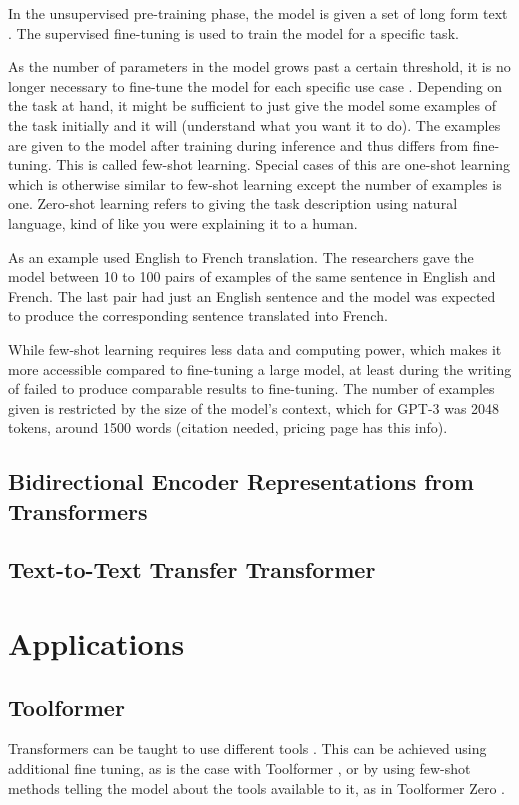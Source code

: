 \documentclass[twoside]{article}
\begin{document}
In the unsupervised pre-training phase, the model is given a set of long form text
\cite{radford_improving_nodate}. The supervised fine-tuning is used to train the
model for a specific task. 

As the number of parameters in the model grows past a certain threshold, it
is no longer necessary to fine-tune the model for each specific use case 
\cite{brown_language_2020}. Depending on the task at hand, it might be sufficient
to just give the model some examples of the task initially and it will (understand what you want it to do). The examples are given to
the model after training during inference and thus differs from fine-tuning. 
This is called few-shot learning. Special cases of this are one-shot learning which is
otherwise similar to few-shot learning except the number of examples is one.
Zero-shot learning refers to giving the task description using natural language,
kind of like you were explaining it to a human. 

As an example \cite{brown_language_2020} used English to French translation.
The researchers gave the model between 10 to 100 pairs of examples of the
same sentence in English and French. The last pair had just an English sentence
and the model was expected to produce the corresponding sentence translated into
French.

While few-shot learning requires less data and computing power, which makes it more
accessible compared to fine-tuning a large model, at least during the writing of 
\cite{brown_language_2020} failed to produce comparable results to fine-tuning.
The number of examples given is restricted by the size of the model's context,
which for GPT-3 was 2048 tokens, around 1500 words (citation needed, pricing page has this info).

\subsection{Bidirectional Encoder Representations from Transformers}

\subsection{Text-to-Text Transfer Transformer}


\section{Applications}

\subsection{Toolformer}
Transformers can be taught to use different tools \cite{schick_toolformer_2023}. 
This can be achieved using additional fine tuning, as is the case with Toolformer
\cite{schick_toolformer_2023}, or by using few-shot methods telling the model 
about the tools available to it, as in Toolformer Zero \cite{markus_toolformer_2023}.


\printbibliography
\end{document}

